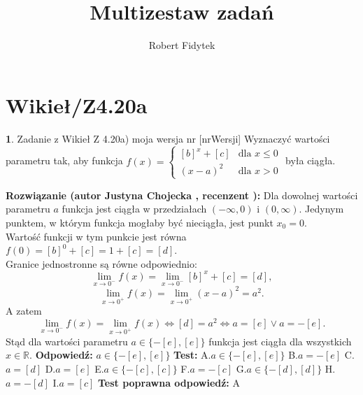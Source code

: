 \documentclass[12pt, a4paper]{article}
\title{Multizestaw zadań}
\author{Robert Fidytek}
\date{}
\theoremstyle{definition} %
\newtheorem{zad}{}
\newcommand{\kategoria}[1]{\section{#1}} %
\newcommand{\zadStart}[1]{\begin{zad}#1\newline} %
\newcommand{\zadStop}{\end{zad}}   %
\newcommand{\rozwStart}[2]{\noindent \textbf{Rozwiązanie (autor #1 , recenzent #2): }\newline} %
\newcommand{\rozwStop}{\newline}                                            %
\newcommand{\odpStart}{\noindent \textbf{Odpowiedź:}\newline}    %
\newcommand{\odpStop}{\newline}                                             %
\newcommand{\testStart}{\noindent \textbf{Test:}\newline} %
\newcommand{\testStop}{\newline} %
\newcommand{\kluczStart}{\noindent \textbf{Test poprawna odpowiedź:}\newline} %
\newcommand{\kluczStop}{\newline} %
\begin{document}
\maketitle


\kategoria{Wikieł/Z4.20a}
\zadStart{Zadanie z Wikieł Z 4.20a) moja wersja nr [nrWersji]}
Wyznaczyć wartości parametru tak, aby funkcja $
f(x) = \left\{ \begin{array}{ll}
[b]^{x}+[c] & \textrm{dla $x\leq 0$}\\
(x-a)^{2} & \textrm{dla $x>0$}
\end{array} \right.
$ była ciągła.
\zadStop
\rozwStart{Justyna Chojecka}{}
Dla dowolnej wartości parametru $a$ funkcja jest ciągła w przedziałach $(-\infty,0)$ i $(0,\infty)$. Jedynym punktem, w którym funkcja mogłaby być nieciągła, jest punkt $x_{0}=0$.\\
Wartość funkcji w tym punkcie jest równa $f(0)=[b]^{0}+[c]=1+[c]=[d]$.\\
Granice jednostronne są równe odpowiednio:
$$\lim\limits_{x\to 0^{-}}f(x)=\lim\limits_{x\to 0^{-}}[b]^{x}+[c]=[d],$$
$$\lim\limits_{x\to 0^{+}}f(x)=\lim\limits_{x\to 0^{+}}(x-a)^{2}=a^{2}.$$
A zatem
$$\lim\limits_{x\to 0^{-}}f(x)=\lim\limits_{x\to 0^{+}}f(x)\iff [d]=a^{2} \iff a=[e] \lor a=-[e].$$
Stąd dla wartości parametru $a\in\{-[e],[e]\}$ funkcja jest ciągła dla wszystkich $x\in\mathbb{R}.$
\rozwStop
\odpStart
$a\in\{-[e],[e]\}$
\odpStop
\testStart
A.$a\in\{-[e],[e]\}$
B.$a=-[e]$
C.$a=[d]$
D.$a=[e]$
E.$a\in\{-[c],[c]\}$
F.$a=-[c]$
G.$a\in\{-[d],[d]\}$
H.$a=-[d]$
I.$a=[c]$
\testStop
\kluczStart
A
\kluczStop
\end{document}
